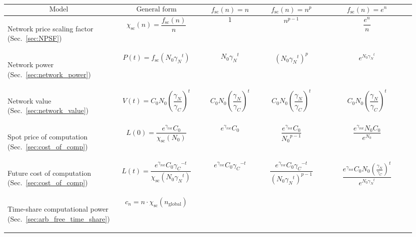 \begin{table}[!htb]
\begin{tabular}{|m{0.21\linewidth}|m{0.21\linewidth}|m{0.15\linewidth}|m{0.155\linewidth}|m{0.225\linewidth}|}
	\hline
	\[\text{Model}\] & \[\text{General form}\] & \[f_\text{sc}(n)=n\] & \[f_\text{sc}(n)=n^p\] & \[f_\text{sc}(n)=e^n\]\\
	\hline \hline
	\begin{flushleft}Network price scaling factor (Sec.~\ref{sec:NPSF})\end{flushleft} & \[\chi_\text{sc}(n)=\frac{f_\text{sc}(n)}{n}\] & \[1\] & \[n^{p-1}\] & \[\frac{e^n}{n}\]\\
	\hline
	\begin{flushleft}Network power (Sec.~\ref{sec:network_power})\end{flushleft} & \[P(t)=f_\text{sc}(N_0{\gamma_N}^t)\] & \[N_0{\gamma_N}^t\] & \[\left(N_0{\gamma_N}^t\right)^p\] & \[ e^{N_0{\gamma_N}^t}\] \\
	\hline
	\begin{flushleft}Network value (Sec.~\ref{sec:network_value})\end{flushleft} & \[V(t)=C_0 N_0 \left(\frac{\gamma_N}{\gamma_C}\right)^t\] & \[C_0 N_0 \left(\frac{\gamma_N}{\gamma_C}\right)^t\] & \[C_0 N_0 \left(\frac{\gamma_N}{\gamma_C}\right)^t\] & \[C_0 N_0 \left(\frac{\gamma_N}{\gamma_C}\right)^t\] \\
	\hline
	\begin{flushleft}Spot price of computation (Sec.~\ref{sec:cost_of_comp})\end{flushleft} & \[L(0)=\frac{e^{\gamma_\text{ror}} C_0}{\chi_\text{sc}(N_0)}\] & \[e^{\gamma_\text{ror}} C_0\] &  \[\frac{e^{\gamma_\text{ror}}C_0}{{N_0}^{p-1}}\] & \[\frac{e^{\gamma_\text{ror}}N_0C_0}{e^{N_0}}\] \\
	\hline
	\begin{flushleft}Future cost of computation (Sec.~\ref{sec:cost_of_comp})\end{flushleft} & \[L(t)=\frac{e^{\gamma_\text{ror}} C_0{\gamma_C}^{-t}}{\chi_\text{sc}(N_0 {\gamma_N}^t)}
\] & \[e^{\gamma_\text{ror}} C_0{\gamma_C}^{-t} \] & \[ \frac{e^{\gamma_\text{ror}} C_0{\gamma_C}^{-t}}{(N_0 {\gamma_N}^t)^{p-1}}
\] & \[ \frac{e^{\gamma_\text{ror}} C_0N_0 \left(\frac{\gamma_N}{\gamma_C}\right)^t}{e^{N_0 {\gamma_N}^t}}\] \\
	\hline
	\begin{flushleft}Time-share computational power (Sec.~\ref{sec:arb_free_time_share})\end{flushleft} & \[c_n=n \cdot \chi_\text{sc}(n_\text{global})
\]
\end{tabular}
\end{table}
